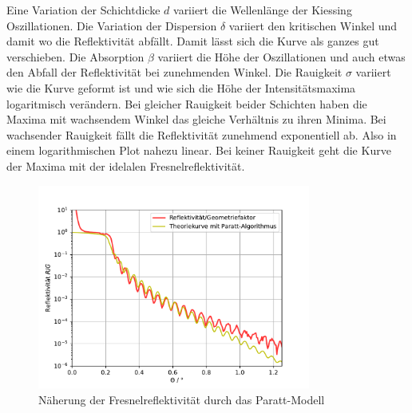 Eine Variation der Schichtdicke $d$ variiert die Wellenlänge der Kiessing Oszillationen. Die Variation der Dispersion $\delta$ variiert den kritischen Winkel
und damit wo die Reflektivität abfällt. Damit lässt sich die Kurve als ganzes gut verschieben. Die Absorption $\beta$ variiert die Höhe der Oszillationen und auch etwas den Abfall der Reflektivität bei 
zunehmenden Winkel. Die Rauigkeit $\sigma$ variiert wie die Kurve geformt ist und wie sich die Höhe der Intensitätsmaxima logaritmisch verändern.
Bei gleicher Rauigkeit beider Schichten haben die Maxima mit wachsendem Winkel das gleiche Verhältnis zu ihren Minima. Bei wachsender Rauigkeit fällt 
die Reflektivität zunehmend exponentiell ab. Also in einem logarithmischen Plot nahezu linear. Bei keiner Rauigkeit geht die Kurve der Maxima mit der idelalen Fresnelreflektivität.
\begin{figure}[H]
    \centering
    \includegraphics[width=0.8\textwidth]{plots/Parattplot.pdf}
    \caption{Näherung der Fresnelreflektivität durch das Paratt-Modell}
    \label{fig:Parattplot}
\end{figure}



